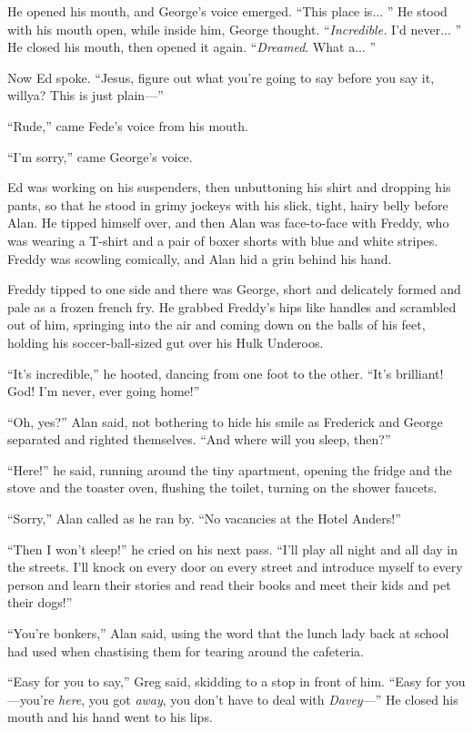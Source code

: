 He opened his mouth, and George's voice emerged.  ``This place is... 
'' He stood with his mouth open, while inside him, George thought. 
``\textit{Incredible.} I'd never...  '' He closed his mouth, then
opened it again.  ``\textit{Dreamed}.  What a...  ''

Now Ed spoke.  ``Jesus, figure out what you're going to say before you
say it, willya?  This is just plain---''

``Rude,'' came Fede's voice from his mouth.

``I'm sorry,'' came George's voice.

Ed was working on his suspenders, then unbuttoning his shirt and
dropping his pants, so that he stood in grimy jockeys with his slick,
tight, hairy belly before Alan.  He tipped himself over, and then Alan
was face-to-face with Freddy, who was wearing a T-shirt and a pair of
boxer shorts with blue and white stripes.  Freddy was scowling
comically, and Alan hid a grin behind his hand.

Freddy tipped to one side and there was George, short and delicately
formed and pale as a frozen french fry.  He grabbed Freddy's hips like
handles and scrambled out of him, springing into the air and coming
down on the balls of his feet, holding his soccer-ball-sized gut over
his Hulk Underoos.

``It's incredible,'' he hooted, dancing from one foot to the other. 
``It's brilliant!  God!  I'm never, ever going home!''

``Oh, yes?'' Alan said, not bothering to hide his smile as Frederick
and George separated and righted themselves.  ``And where will you
sleep, then?''

``Here!'' he said, running around the tiny apartment, opening the
fridge and the stove and the toaster oven, flushing the toilet,
turning on the shower faucets.

``Sorry,'' Alan called as he ran by.  ``No vacancies at the Hotel
Anders!''

``Then I won't sleep!'' he cried on his next pass.  ``I'll play all
night and all day in the streets.  I'll knock on every door on every
street and introduce myself to every person and learn their stories
and read their books and meet their kids and pet their dogs!''

``You're bonkers,'' Alan said, using the word that the lunch lady back
at school had used when chastising them for tearing around the
cafeteria.

``Easy for you to say,'' Greg said, skidding to a stop in front of
him.  ``Easy for you---you're \textit{here}, you got \textit{away},
you don't have to deal with \textit{Davey}---'' He closed his mouth
and his hand went to his lips.

